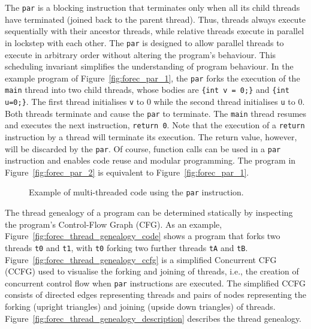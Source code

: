 The \verb$par$ is a blocking instruction that terminates only when all
its child threads have terminated (joined back to the parent thread). 
Thus, threads always execute sequentially with their ancestor threads,
while relative threads execute in parallel in lockstep with each other.
The \verb$par$ is designed to allow parallel threads to execute in arbitrary order 
without altering the program's behaviour. This scheduling invariant 
simplifies the understanding of program behaviour. 
In the example program of Figure~\ref{fig:forec_par_1},
the \verb$par$ forks the execution of the \verb$main$ thread into 
two child threads, whose bodies are \verb${int v = 0;}$ and 
\verb${int u=0;}$. The first thread initialises \verb$v$ to 
$0$ while the second thread initialises \verb$u$ to $0$. Both 
threads terminate and cause the \verb$par$ to terminate. The
\verb$main$ thread resumes and executes the next instruction, \verb$return 0$.
Note that the execution of a \verb$return$ instruction by a thread will 
terminate its execution. The return value, however, will be discarded by 
the \verb$par$. Of course, function calls can be used in a \verb$par$ instruction and
enables code reuse and modular programming. The program in Figure~\ref{fig:forec_par_2}
is equivalent to Figure~\ref{fig:forec_par_1}. 

\begin{figure}
	\centering
	
	\hfill
	
	\caption{Example of multi-threaded code using the \texttt{par} instruction.}
	\label{fig:forec_par}
\end{figure}

The thread genealogy of a program can be determined statically by 
inspecting the program's Control-Flow Graph (CFG). As an example, 
Figure~\ref{fig:forec_thread_genealogy_code} shows a program that 
forks two threads \verb$t0$ and \verb$t1$, with \verb$t0$ forking two further threads
\verb$tA$ and \verb$tB$. Figure~\ref{fig:forec_thread_genealogy_ccfg} is a simplified 
Concurrent CFG (CCFG) used to visualise the forking and joining of threads, i.e., the creation of 
concurrent control flow when \verb$par$ instructions are executed. The simplified 
CCFG consists of directed edges representing threads and pairs of nodes representing the 
forking (upright triangles) and joining (upside down triangles) of threads.
Figure~\ref{fig:forec_thread_genealogy_description} describes the thread genealogy.

